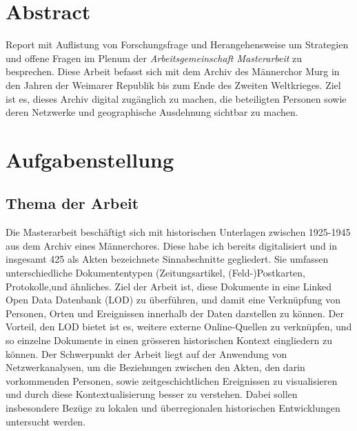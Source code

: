 \documentclass[12pt, a4paper, ngerman, bidi=default]{article}
\begin{document}
\vfill
\newpage
\pagecolor{white} %
\justifying     %
\begin{spacing}{1.5}
\section*{Abstract}

Report mit Auflistung von Forschungsfrage und Herangehensweise um Strategien und offene Fragen im Plenum der \textit{Arbeitsgemeinschaft Masterarbeit} zu besprechen. Diese Arbeit befasst sich mit dem Archiv des Männerchor Murg in den Jahren der Weimarer Republik bis zum Ende des Zweiten Weltkrieges. Ziel ist es, dieses Archiv digital zugänglich zu machen, die beteiligten Personen sowie deren Netzwerke und geographische Ausdehnung sichtbar zu machen.
\section{Aufgabenstellung}
\subsection {\textbf{Thema der Arbeit}}

Die Masterarbeit beschäftigt sich mit historischen Unterlagen zwischen 1925-1945 aus dem Archiv eines Männerchores. Diese habe ich bereits digitalisiert und in insgesamt 425 als Akten bezeichnete Sinnabschnitte gegliedert. Sie umfassen unterschiedliche Dokumententypen (Zeitungsartikel, (Feld-)Postkarten, Protokolle,und ähnliches. Ziel der Arbeit ist, diese Dokumente in eine Linked Open Data Datenbank (LOD) zu überführen, und damit eine Verknüpfung von Personen, Orten und Ereignissen innerhalb der Daten darstellen zu können. Der Vorteil, den LOD bietet ist es, weitere externe Online-Quellen zu verknüpfen, und so einzelne Dokumente in einen grösseren historischen Kontext eingliedern zu können. 
Der Schwerpunkt der Arbeit liegt auf der Anwendung von Netzwerkanalysen, um die Beziehungen zwischen den Akten, den darin vorkommenden Personen, sowie zeitgeschichtlichen Ereignissen zu visualisieren und durch diese Kontextualisierung besser zu verstehen. Dabei sollen insbesondere Bezüge zu lokalen und überregionalen historischen Entwicklungen untersucht werden.


\end{spacing}
\end{document}
